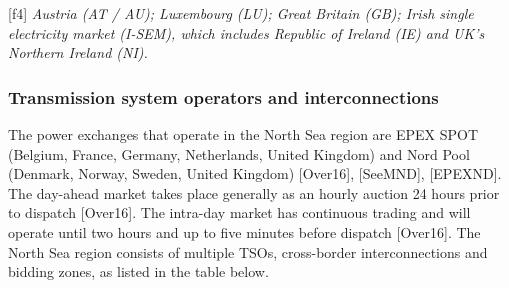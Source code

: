 \protect\hypertarget{f4}{}{{[}f4{]}} \emph{Austria (AT / AU); Luxembourg
(LU); Great Britain (GB); Irish single electricity market (I-SEM), which
includes Republic of Ireland (IE) and UK's Northern Ireland (NI).}

\hypertarget{transmission-system-operators-and-interconnections}{%
\subsubsection{Transmission system operators and
interconnections}\label{transmission-system-operators-and-interconnections}}

The power exchanges that operate in the North Sea region are EPEX SPOT
(Belgium, France, Germany, Netherlands, United Kingdom) and Nord Pool
(Denmark, Norway, Sweden, United Kingdom) {[}Over16{]}, {[}SeeMND{]},
{[}EPEXND{]}. The day-ahead market takes place generally as an hourly
auction 24 hours prior to dispatch {[}Over16{]}. The intra-day market
has continuous trading and will operate until two hours and up to five
minutes before dispatch {[}Over16{]}. The North Sea region consists of
multiple TSOs, cross-border interconnections and bidding zones, as
listed in the table below.

